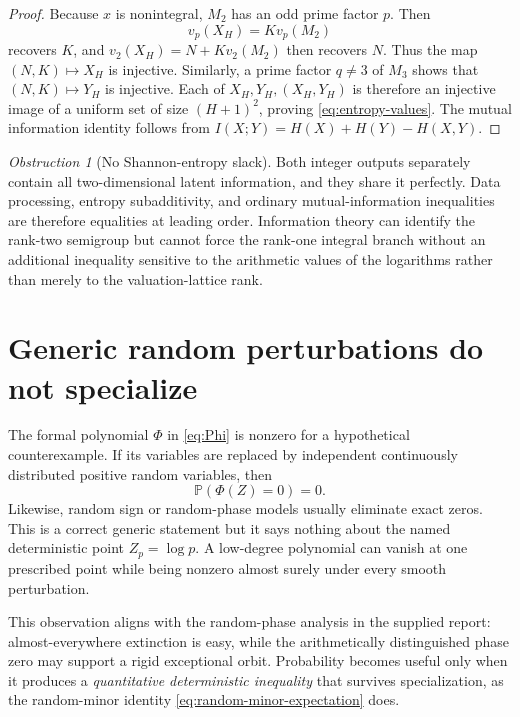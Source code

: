 \documentclass[11pt,oneside]{article}
\theoremstyle{definition}
\theoremstyle{remark}
\newtheorem{obstruction}[theorem]{Obstruction}
\newcommand{\Mtwo}{M_2}
\newcommand{\Mthree}{M_3}
\newcommand{\Prob}{\mathbb{P}}
\begin{document}
\begin{proof}
Because $x$ is nonintegral, $\Mtwo$ has an odd prime factor $p$.  Then
\[
 v_p(X_H)=K v_p(\Mtwo)
\]
recovers $K$, and $v_2(X_H)=N+K v_2(\Mtwo)$ then recovers $N$.  Thus the map $(N,K)\mapsto X_H$ is injective.  Similarly, a prime factor $q\ne3$ of $\Mthree$ shows that $(N,K)\mapsto Y_H$ is injective.  Each of $X_H,Y_H,(X_H,Y_H)$ is therefore an injective image of a uniform set of size $(H+1)^2$, proving \eqref{eq:entropy-values}.  The mutual information identity follows from
$I(X;Y)=H(X)+H(Y)-H(X,Y)$.
\end{proof}

\begin{obstruction}[No Shannon-entropy slack]
Both integer outputs separately contain all two-dimensional latent information, and they share it perfectly.  Data processing, entropy subadditivity, and ordinary mutual-information inequalities are therefore equalities at leading order.  Information theory can identify the rank-two semigroup but cannot force the rank-one integral branch without an additional inequality sensitive to the arithmetic values of the logarithms rather than merely to the valuation-lattice rank.
\end{obstruction}

\section{Generic random perturbations do not specialize}
\label{sec:generic-no-go}

The formal polynomial $\Phi$ in \eqref{eq:Phi} is nonzero for a hypothetical counterexample.  If its variables are replaced by independent continuously distributed positive random variables, then
\begin{equation}
 \Prob(\Phi(Z)=0)=0.
 \label{eq:generic-zero}
\end{equation}
Likewise, random sign or random-phase models usually eliminate exact zeros.  This is a correct generic statement but it says nothing about the named deterministic point $Z_p=\log p$.  A low-degree polynomial can vanish at one prescribed point while being nonzero almost surely under every smooth perturbation.

This observation aligns with the random-phase analysis in the supplied report: almost-everywhere extinction is easy, while the arithmetically distinguished phase zero may support a rigid exceptional orbit.  Probability becomes useful only when it produces a \emph{quantitative deterministic inequality} that survives specialization, as the random-minor identity \eqref{eq:random-minor-expectation} does.
\end{document}
